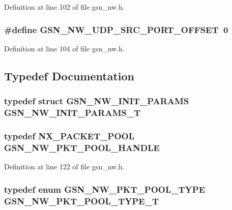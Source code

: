Definition at line 102 of file gsn\_\-nw.h.

\hypertarget{a00532_aa423d3b52e047f9e63851c51c661af6f}{
\subsubsection[{GSN\_\-NW\_\-UDP\_\-SRC\_\-PORT\_\-OFFSET}]{\setlength{\rightskip}{0pt plus 5cm}\#define GSN\_\-NW\_\-UDP\_\-SRC\_\-PORT\_\-OFFSET~0}}
\label{a00532_aa423d3b52e047f9e63851c51c661af6f}


Definition at line 104 of file gsn\_\-nw.h.



\subsection{Typedef Documentation}
\hypertarget{a00532_ad66a56e7fe3cb8fa6e4a36b1cc90c781}{
\subsubsection[{GSN\_\-NW\_\-INIT\_\-PARAMS\_\-T}]{\setlength{\rightskip}{0pt plus 5cm}typedef struct {\bf GSN\_\-NW\_\-INIT\_\-PARAMS} {\bf GSN\_\-NW\_\-INIT\_\-PARAMS\_\-T}}}
\label{a00532_ad66a56e7fe3cb8fa6e4a36b1cc90c781}
\hypertarget{a00532_afccc5835aa5e2916600678de68186848}{
\subsubsection[{GSN\_\-NW\_\-PKT\_\-POOL\_\-HANDLE}]{\setlength{\rightskip}{0pt plus 5cm}typedef NX\_\-PACKET\_\-POOL {\bf GSN\_\-NW\_\-PKT\_\-POOL\_\-HANDLE}}}
\label{a00532_afccc5835aa5e2916600678de68186848}


Definition at line 122 of file gsn\_\-nw.h.

\hypertarget{a00532_a777bb6c45bce65d3ede8311de122d451}{
\subsubsection[{GSN\_\-NW\_\-PKT\_\-POOL\_\-TYPE\_\-T}]{\setlength{\rightskip}{0pt plus 5cm}typedef enum {\bf GSN\_\-NW\_\-PKT\_\-POOL\_\-TYPE} {\bf GSN\_\-NW\_\-PKT\_\-POOL\_\-TYPE\_\-T}}}
\label{a00532_a777bb6c45bce65d3ede8311de122d451}


